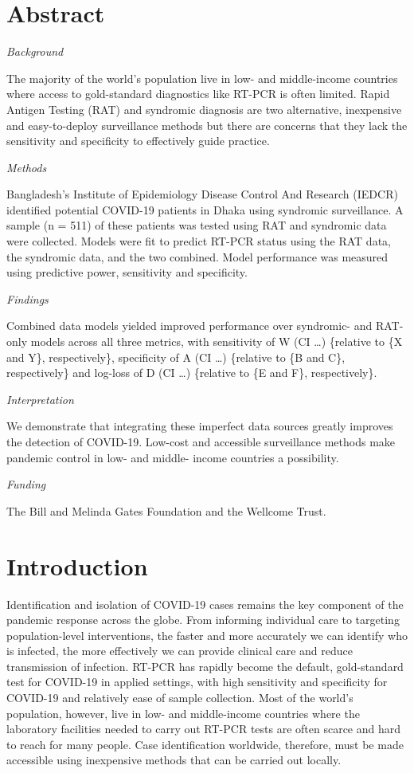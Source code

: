 \documentclass[]{elsarticle} %
\begin{document}
\hypertarget{abstract}{%
\section{Abstract}\label{abstract}}

\emph{Background}

The majority of the world's population live in low- and middle-income
countries where access to gold-standard diagnostics like RT-PCR is often
limited. Rapid Antigen Testing (RAT) and syndromic diagnosis are two
alternative, inexpensive and easy-to-deploy surveillance methods but
there are concerns that they lack the sensitivity and specificity to
effectively guide practice.

\emph{Methods}

Bangladesh's Institute of Epidemiology Disease Control And Research
(IEDCR) identified potential COVID-19 patients in Dhaka using syndromic
surveillance. A sample (n = 511) of these patients was tested using RAT
and syndromic data were collected. Models were fit to predict RT-PCR
status using the RAT data, the syndromic data, and the two combined.
Model performance was measured using predictive power, sensitivity and
specificity.

\emph{Findings}

Combined data models yielded improved performance over syndromic- and
RAT-only models across all three metrics, with sensitivity of W (CI
\ldots) \{relative to \{X and Y\}, respectively\}, specificity of A (CI
\ldots) \{relative to \{B and C\}, respectively\} and log-loss of D (CI
\ldots) \{relative to \{E and F\}, respectively\}.

\emph{Interpretation}

We demonstrate that integrating these imperfect data sources greatly
improves the detection of COVID-19. Low-cost and accessible surveillance
methods make pandemic control in low- and middle- income countries a
possibility.

\emph{Funding}

The Bill and Melinda Gates Foundation and the Wellcome Trust.

\hypertarget{introduction}{%
\section{Introduction}\label{introduction}}

Identification and isolation of COVID-19 cases remains the key component
of the pandemic response across the globe. From informing individual
care to targeting population-level interventions, the faster and more
accurately we can identify who is infected, the more effectively we can
provide clinical care and reduce transmission of infection. RT-PCR has
rapidly become the default, gold-standard test for COVID-19 in applied
settings, with high sensitivity and specificity for COVID-19 and
relatively ease of sample collection. Most of the world's population,
however, live in low- and middle-income countries where the laboratory
facilities needed to carry out RT-PCR tests are often scarce and hard to
reach for many people. Case identification worldwide, therefore, must be
made accessible using inexpensive methods that can be carried out
locally.
\end{document}

